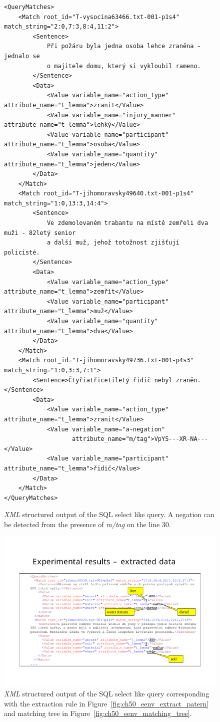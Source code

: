 \begin{figure}[ht]
\begin{verbatim}
<QueryMatches>
	<Match root_id="T-vysocina63466.txt-001-p1s4" match_string="2:0,7:3,8:4,11:2">
		<Sentence>
			Při požáru byla jedna osoba lehce zraněna - jednalo se
			o majitele domu, který si vykloubil rameno.
		</Sentence>
		<Data>
			<Value variable_name="action_type" attribute_name="t_lemma">zranit</Value>
			<Value variable_name="injury_manner" attribute_name="t_lemma">lehký</Value>
			<Value variable_name="participant" attribute_name="t_lemma">osoba</Value>
			<Value variable_name="quantity" attribute_name="t_lemma">jeden</Value>
		</Data>
	</Match>
	<Match root_id="T-jihomoravsky49640.txt-001-p1s4" match_string="1:0,13:3,14:4">
		<Sentence>
			Ve zdemolovaném trabantu na místě zemřeli dva muži - 82letý senior
			a další muž, jehož totožnost zjišťují policisté.
		</Sentence>
		<Data>
			<Value variable_name="action_type" attribute_name="t_lemma">zemřít</Value>
			<Value variable_name="participant" attribute_name="t_lemma">muž</Value>
			<Value variable_name="quantity" attribute_name="t_lemma">dva</Value>
		</Data>
	</Match>
	<Match root_id="T-jihomoravsky49736.txt-001-p4s3" match_string="1:0,3:3,7:1">
		<Sentence>Čtyřiatřicetiletý řidič nebyl zraněn.</Sentence>
		<Data>
			<Value variable_name="action_type" attribute_name="t_lemma">zranit</Value>
			<Value variable_name="a-negation" 
			       attribute_name="m/tag">VpYS---XR-NA---</Value>
			<Value variable_name="participant" attribute_name="t_lemma">řidič</Value>
		</Data>
	</Match>
</QueryMatches>
\end{verbatim}
\caption{\emph{XML} structured output of the SQL select like query. A negation can be detected from the presence of \emph{m/tag} on the line 30.}
\label{fig:select_xml}
\end{figure}

\begin{figure}
	\centering
		\includegraphics[angle=-90, width=0.7\hsize]{eenv_results}
	\caption{\emph{XML} structured output of the SQL select like query corresponding with the extraction rule in Figure~\ref{fig:ch50_eenv_extract_patern} and matching tree in Figure~\ref{fig:ch50_eenv_matching_tree}.}
	\label{fig:ch50_eenv_results}
\end{figure}





